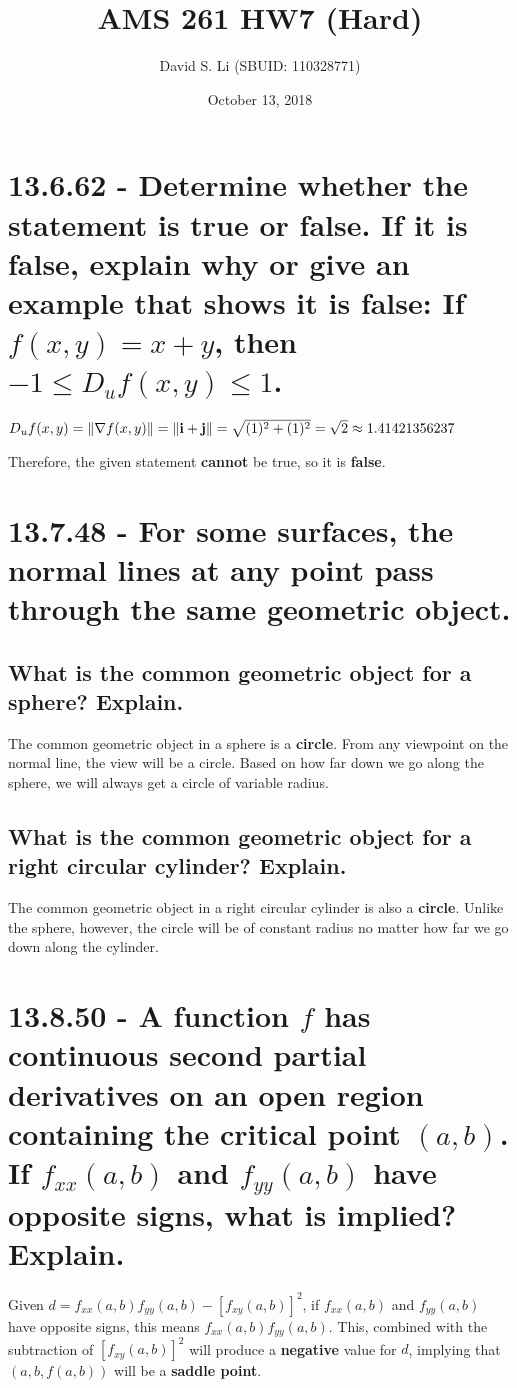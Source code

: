 \documentclass{article}
\title{AMS 261 HW7 (Hard)}
\author{David S. Li (SBUID: 110328771)}
\date{October 13, 2018}
\begin{document}
\maketitle

\section{13.6.62 - Determine whether the statement is true or false.  If it is false, explain why or give an example that shows it is false: If $f(x, y) = x + y$, then $-1 \leq D_{u}f(x, y) \leq 1$.}

\par\noindent\large $D_{u}f(x, y) = \norm{\nabla f(x, y)} = \norm{\textbf{i} + \textbf{j}} = \sqrt{(1)^{2} + (1)^{2}} = \sqrt{2} \approx 1.41421356237$ 
\par\noindent\large Therefore, the given statement \textbf{cannot} be true, so it is \textbf{false}.

\section{13.7.48 - For some surfaces, the normal lines at any point pass through the same geometric object.}
\subsection{What is the common geometric object for a sphere?  Explain.}
\par\noindent\large The common geometric object in a sphere is a \textbf{circle}.  From any viewpoint on the normal line, the view will be a circle.  Based on how far down we go along the sphere, we will always get a circle of variable radius.

\subsection{What is the common geometric object for a right circular cylinder?  Explain.}
\par\noindent\large The common geometric object in a right circular cylinder is also a \textbf{circle}.  Unlike the sphere, however, the circle will be of constant radius no matter how far we go down along the cylinder.

\section{13.8.50 - A function $f$ has continuous second partial derivatives on an open region containing the critical point $(a, b)$.  If $f_{xx}(a, b)$ and $f_{yy}(a, b)$ have opposite signs, what is implied?  Explain.}
\par\noindent\large Given $d = f_{xx}(a, b)f_{yy}(a, b) - [f_{xy}(a, b)]^{2}$, if $f_{xx}(a, b)$ and $f_{yy}(a, b)$ have opposite signs, this means $f_{xx}(a, b)f_{yy}(a, b)$.  This, combined with the subtraction of $[f_{xy}(a, b)]^{2}$ will produce a \textbf{negative} value for $d$, implying that $(a, b, f(a, b))$ will be a \textbf{saddle point}.
\end{document}
